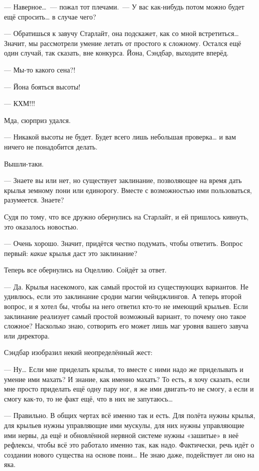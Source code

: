 \documentclass[fontsize=11pt,a5paper,titlepage=firstcover]{scrbook}
\begin{document}
--- Наверное{\ldots}~--- пожал тот плечами.~--- У вас как-нибудь потом можно будет ещё спросить{\ldots} в случае чего?

--- Обратишься к завучу Старлайт, она подскажет, как со мной встретиться{\ldots} Значит, мы рассмотрели умение летать от простого к сложному. Остался ещё один случай, так сказать, вне конкурса. Йона, Сэндбар, выходите вперёд.

--- Мы-то какого сена?!

--- Йона бояться высоты!

--- КХМ!!!

Мда, сюрприз удался.

--- Никакой высоты не будет. Будет всего лишь небольшая проверка{\ldots} и вам ничего не понадобится делать.

Вышли-таки.

--- Знаете вы или нет, но существует заклинание, позволяющее на время дать крылья земному пони или единорогу. Вместе с возможностью ими пользоваться, разумеется. Знаете?

Судя по тому, что все дружно обернулись на Старлайт, и ей пришлось кивнуть, это оказалось новостью.

--- Очень хорошо. Значит, придётся честно подумать, чтобы ответить. Вопрос первый: \emph{какие} крылья даст это заклинание?

Теперь все обернулись на Оцеллию. Сойдёт за ответ.

--- Да. Крылья насекомого, как самый простой из существующих вариантов. Не удивлюсь, если это заклинание сродни магии чейнджлингов. А теперь второй вопрос, и я хотел бы, чтобы на него ответил кто-то не имеющий крыльев. Если заклинание реализует самый простой возможный вариант, то почему оно такое сложное? Насколько знаю, сотворить его может лишь маг уровня вашего завуча или директора.

Сэндбар изобразил некий неопределённый жест:

--- Ну{\ldots} Если мне приделать крылья, то вместе с ними надо же приделывать и умение ими махать? И знание, как именно махать? То есть, я хочу сказать, если мне просто приделать ещё одну пару ног, я же ими двигать-то не смогу, а если и смогу как-то, то не факт ещё, что в них не запутаюсь{\ldots}

--- Правильно. В общих чертах всё именно так и есть. Для полёта нужны крылья, для крыльев нужны управляющие ими мускулы, для них нужны управляющие ими нервы, да ещё и обновлённой нервной системе нужны «зашитые» в неё рефлексы, чтобы всё это работало именно так, как надо. Фактически, речь идёт о создании нового существа на основе пони{\ldots} Не знаю даже, подействует ли оно на яка.
\end{document}
